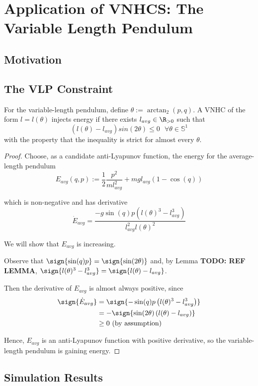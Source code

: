 
\chapter{Application of VNHCS: The Variable Length Pendulum}\label{sec:vlp}
\section{Motivation}
\section{The VLP Constraint}

\begin{thm}
For the variable-length pendulum, define \(\theta := \arctan_2(p,q)\). 
A VNHC of the form \(l = l(\theta)\) injects energy if there exists \(l_{avg} \in \R_{>0}\) such that
\[
   \left(l(\theta) - l_{avg}\right)sin(2\theta) \leq 0 \text{ }\forall \theta \in \mathbb{S}^1
\]
with the property that the inequality is strict for almost every \(\theta\).
\end{thm}
\begin{proof}
    Choose, as a candidate anti-Lyapunov function, the energy for the average-length pendulum 
    \[
       E_{avg}(q,p) := \frac{1}{2}\frac{p^2}{m l_{avg}^2} 
                    + m g l_{avg} (1-\cos(q))
    \]

    which is non-negative and has derivative 
    \[
      \dot{E}_{avg} = \frac{-g\sin(q)p \left(l(\theta)^3 - l_{avg}^3\right)}
                 {l_{avg}^2l(\theta)^2}
    \]

    We will show that \(E_{avg}\) is increasing.

    Observe that \(\sign{\sin(q)p} = \sign{\sin(2\theta)}\) and, 
    by Lemma \textbf{TODO: REF LEMMA},
    \( \sign{l(\theta)^3 - l_{avg}^3} 
     = \sign{ l(\theta) - l_{avg}}\). 

     Then the derivative of \(E_{avg}\) is almost always positive, since
     \begin{align*}
        \label{eq:}
        \sign{\dot{E}_{avg}} &= \sign{-\sin(q)p \left(l(\theta)^3 - l_{avg}^3\right)} \\
                    &= -\sign{\sin(2\theta) \left(l(\theta) - l_{avg}\right)} \\
                    &\geq 0 \text{ (by assumption)}
     \end{align*}

      Hence, \(E_{avg}\) is an anti-Lyapunov function with positive derivative,  
      so the variable-length pendulum is gaining energy.
\end{proof}

\section{Simulation Results}

